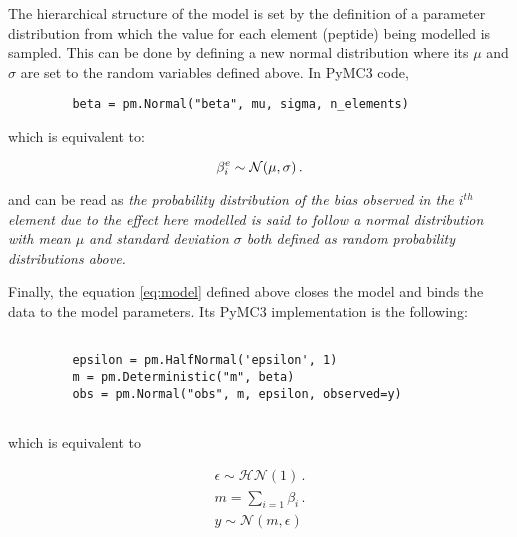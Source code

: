 The hierarchical structure of the model is set by the definition of a parameter distribution from which the value for each element (peptide) being modelled is sampled. This can be done by defining a new normal distribution where its $\mu$ and $\sigma$ are set to the random variables defined above. In PyMC3 code,

\begin{verbatim}
         beta = pm.Normal("beta", mu, sigma, n_elements)  
\end{verbatim}

which is equivalent to:

\begin{equation}
\beta^e_i \sim \mathcal{N}(\mu, \sigma)\,.  \\
\end{equation}

and can be read as \textit{the probability distribution of the bias observed in the $i^{th}$ element due to the effect here modelled is said to follow a normal distribution with mean $\mu$ and standard deviation $\sigma$ both defined as random probability distributions above.}

Finally, the equation \ref{eq:model} defined above closes the model and binds the data to the model parameters. Its PyMC3 implementation is the following:

\begin{verbatim}
               
         epsilon = pm.HalfNormal('epsilon', 1)                
         m = pm.Deterministic("m", beta)
         obs = pm.Normal("obs", m, epsilon, observed=y)
      
\end{verbatim}

which is equivalent to

\begin{align}
\nonumber \epsilon \sim \mathcal{HN}(1) \,. \\ 
m = \sum_{i=1} \beta_i \,. \\ 
\nonumber y \sim \mathcal{N}(m, \epsilon)
\end{align}

